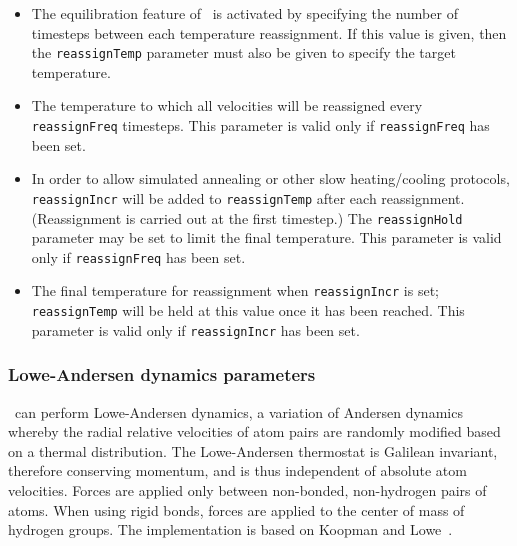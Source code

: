 \begin{itemize}

\item
{}
{The equilibration feature of \NAMD\ is activated by 
specifying the number of timesteps between each temperature reassignment.
If this value is given, then the {\tt reassignTemp} parameter must also 
be given to specify the target temperature. }

\item
{}
{The temperature to which all velocities will be reassigned
every {\tt reassignFreq} timesteps.  
This parameter is valid only if {\tt reassignFreq} has been set.}

\item
{}
{In order to allow simulated annealing or other slow heating/cooling protocols, {\tt reassignIncr} will be added to {\tt reassignTemp} after each reassignment.
(Reassignment is carried out at the first timestep.)  The {\tt reassignHold} parameter may be set to limit the final temperature.
This parameter is valid only if {\tt reassignFreq} has been set.}

\item
{}
{The final temperature for reassignment when {\tt reassignIncr} is set; {\tt reassignTemp} will be held at this value once it has been reached.
This parameter is valid only if {\tt reassignIncr} has been set.}

\end{itemize}

\subsubsection{Lowe-Andersen dynamics parameters}

\NAMD\ can perform Lowe-Andersen dynamics, a variation of Andersen dynamics whereby the radial relative velocities of atom pairs are randomly modified based on a thermal distribution.
The Lowe-Andersen thermostat is Galilean invariant, therefore conserving momentum, and is thus independent of absolute atom velocities.
Forces are applied only between non-bonded, non-hydrogen pairs of atoms.
When using rigid bonds, forces are applied to the center of mass of hydrogen groups.
The implementation is based on Koopman and Lowe~.

